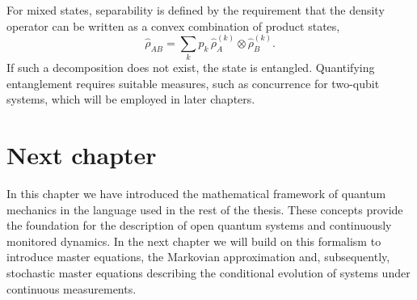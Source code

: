 For mixed states, separability is defined by the requirement that the density operator can be written as a convex combination of product states,
\begin{equation}
	\hat{\rho}_{AB} = \sum_k p_k \, \hat{\rho}_A^{(k)} \otimes \hat{\rho}_B^{(k)}.
\end{equation}
If such a decomposition does not exist, the state is entangled. 
Quantifying entanglement requires suitable measures, such as concurrence for two-qubit systems, which will be employed in later chapters.

\section{Next chapter}

In this chapter we have introduced the mathematical framework of quantum mechanics in the language used in the rest of the thesis. 
These concepts provide the foundation for the description of open quantum systems and continuously monitored dynamics. 
In the next chapter we will build on this formalism to introduce master equations, the Markovian approximation and, subsequently, stochastic master equations describing the conditional evolution of systems under continuous measurements.
